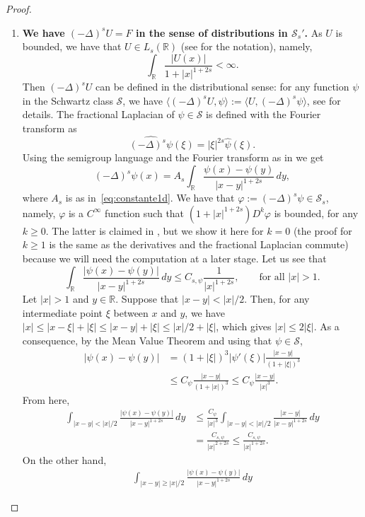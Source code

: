 \documentclass[a4paper,11pt,reqno]{amsart}
\newcommand{\R}{\mathbb{R}}
\theoremstyle{definition}
\numberwithin{equation}{section}
\begin{document}
\begin{proof}
\begin{enumerate}[$(1)$]
\item \textbf{We have $(-\Delta)^sU=F$ in the sense of distributions in $\mathcal{S}_s'$.} As $U$ is
bounded, we have that $U\in L_s(\R)$ (see \cite{Silvestre-CPAM} for the notation), namely,
$$
\int_{\R}\frac{|U(x)|}{1+|x|^{1+2s}}<\infty.
$$
Then $(-\Delta)^sU$ can be defined in the distributional sense:
for any function $\psi$ in the Schwartz class $\mathcal{S}$, we have
$\langle (-\Delta)^sU,\psi\rangle:=\langle U,(-\Delta)^s\psi\rangle$, see \cite[p.~73]{Silvestre-CPAM} for details.
The fractional Laplacian of $\psi\in\mathcal{S}$ is defined with the Fourier transform as
$$
\widehat{(-\Delta)^s\psi}(\xi)=|\xi|^{2s}\widehat{\psi}(\xi).
$$
Using the semigroup language and the Fourier transform as in \cite{Stinga, Stinga-Torrea} we get
$$
(-\Delta)^s\psi(x)=A_s\int_{\R}\frac{\psi(x)-\psi(y)}{|x-y|^{1+2s}}\,dy,
$$
where $A_s$ is as in~\eqref{eq:constante1d}.
We have that $\varphi:=(-\Delta)^s\psi\in\mathcal{S}_s$, namely,
$\varphi$ is a $C^\infty$ function such that $(1+|x|^{1+2s})D^k\varphi$
is bounded, for any $k\geq0$. The latter is claimed in \cite[p.~73]{Silvestre-CPAM}, but we
show it here for $k=0$
(the proof for $k\geq1$ is the same as the derivatives and the fractional Laplacian commute)
because we will need the computation at a later stage. Let us see that
\begin{equation}
\label{eq:cuenta}
\int_{\R}\frac{|\psi(x)-\psi(y)|}{|x-y|^{1+2s}}\,dy\leq C_{s,\psi}\frac{1}{|x|^{1+2s}},
\qquad\text{for all } |x|>1.
\end{equation}
Let $|x|>1$ and $y\in\R$. Suppose that $|x-y|<|x|/2$.
Then, for any intermediate point $\xi$ between $x$ and $y$, we have
$|x|\leq |x-\xi|+|\xi|\leq |x-y|+|\xi|\leq |x|/2+|\xi|$,
which gives $|x|\leq 2|\xi|$. As a consequence, by the Mean Value Theorem and using that $\psi\in\mathcal{S}$,
\begin{align*}
|\psi(x)-\psi(y)| &=(1+|\xi|)^3|\psi'(\xi)|\frac{|x-y|}{(1+|\xi|)^3} \\
&\leq C_\psi\frac{|x-y|}{(1+|x|)^3}\leq C_\psi\frac{|x-y|}{|x|^3}.
\end{align*}
From here,
\begin{align*}
\int_{|x-y|<|x|/2}\frac{|\psi(x)-\psi(y)|}{|x-y|^{1+2s}}\,dy &\leq
\frac{C_{\psi}}{|x|^3}\int_{|x-y|<|x|/2}\frac{|x-y|}{|x-y|^{1+2s}}\,dy \\
&=\frac{C_{s,\psi}}{|x|^{2+2s}}\leq\frac{C_{s,\psi}}{|x|^{1+2s}}.
\end{align*}
On the other hand,
\begin{align*}
\int_{|x-y|\geq|x|/2}\frac{|\psi(x)-\psi(y)|}{|x-y|^{1+2s}}\,dy

\end{align*}
\end{enumerate}
\end{proof}
\end{document}
